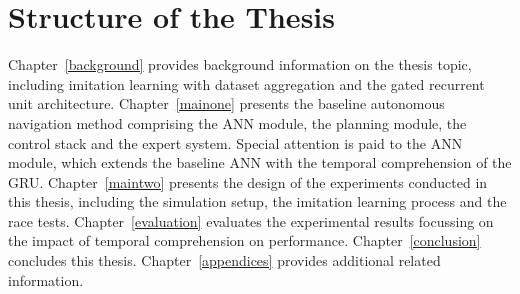 \section{Structure of the Thesis}




Chapter~\ref{background}
provides background information on the thesis topic,
including imitation learning with dataset aggregation
and the gated recurrent unit architecture.
Chapter~\ref{mainone} presents
the baseline autonomous navigation method
comprising the ANN module, 
the planning module, the control stack and the expert system.
Special attention is paid to the ANN module,
which extends the baseline ANN with the temporal comprehension of the GRU.
Chapter~\ref{maintwo} presents the design of the
experiments conducted in this thesis,
including the simulation setup,
the imitation learning process and the race tests.
Chapter~\ref{evaluation} evaluates 
the experimental results
focussing on the impact of temporal comprehension on performance.
Chapter~\ref{conclusion} concludes this thesis. 
Chapter~\ref{appendices} provides additional related information.